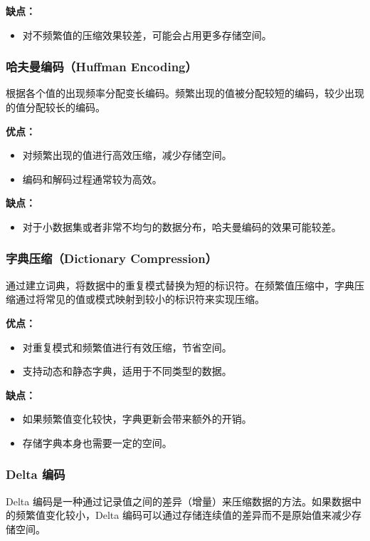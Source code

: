 \documentclass[12pt]{article}
\begin{document}
\textbf{缺点：}
\begin{itemize}
  \item 对不频繁值的压缩效果较差，可能会占用更多存储空间。
\end{itemize}

\subsubsection{哈夫曼编码（Huffman Encoding）}
根据各个值的出现频率分配变长编码。频繁出现的值被分配较短的编码，较少出现的值分配较长的编码。

\textbf{优点：}
\begin{itemize}
  \item 对频繁出现的值进行高效压缩，减少存储空间。
  \item 编码和解码过程通常较为高效。
\end{itemize}

\textbf{缺点：}
\begin{itemize}
  \item 对于小数据集或者非常不均匀的数据分布，哈夫曼编码的效果可能较差。
\end{itemize}

\subsubsection{字典压缩（Dictionary Compression）}
通过建立词典，将数据中的重复模式替换为短的标识符。在频繁值压缩中，字典压缩通过将常见的值或模式映射到较小的标识符来实现压缩。

\textbf{优点：}
\begin{itemize}
  \item 对重复模式和频繁值进行有效压缩，节省空间。
  \item 支持动态和静态字典，适用于不同类型的数据。
\end{itemize}

\textbf{缺点：}
\begin{itemize}
  \item 如果频繁值变化较快，字典更新会带来额外的开销。
  \item 存储字典本身也需要一定的空间。
\end{itemize}

\subsubsection{Delta 编码}
Delta 编码是一种通过记录值之间的差异（增量）来压缩数据的方法。如果数据中的频繁值变化较小，Delta 编码可以通过存储连续值的差异而不是原始值来减少存储空间。
\end{document}
